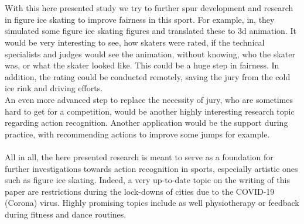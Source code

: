 \\\mbox{}\\
With this here presented study we try to further spur development and research in figure ice skating to improve
fairness in this sport.
For example, in\cite{figureskatingsimulation}, they simulated some figure ice skating figures and translated these to 3d
animation. It would be very interesting to see, how skaters were rated, if the technical specialists and judges would see
the animation, without knowing, who the skater was, or what the skater looked like.
This could be a huge step in fairness.
In addition, the rating could be conducted remotely, saving the jury from the cold
ice rink and driving efforts.\\
An even more advanced step to replace the necessity of jury, who are sometimes hard to get for a competition, would be another
highly interesting research topic regarding action recognition.
Another application would be the support during practice, with recommending actions to improve some jumps for example.
\\\mbox{}\\
All in all, the here presented research is meant to serve as a foundation for further investigations towards action recognition
in sports, especially artistic ones such as figure ice skating.
Indeed, a very up-to-date topic on the writing of this paper are restrictions during the lock-downs of cities due to the
COVID-19 (Corona) virus.
Highly promising topics include as well physiotherapy or feedback during fitness and dance routines.
